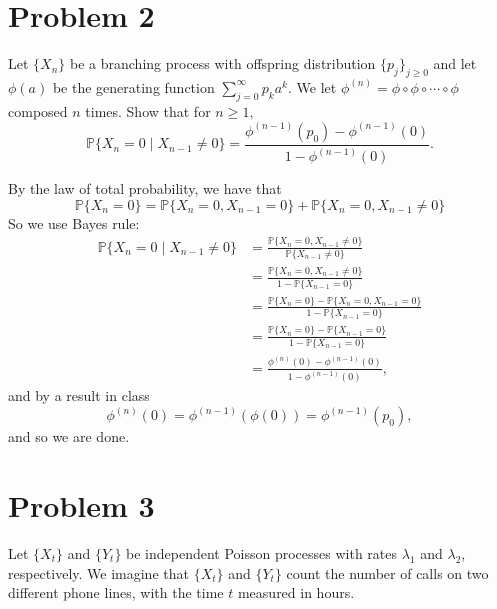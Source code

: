 \documentclass[11pt]{article}
\newcommand{\bbP}{\mathbb{P}}
\begin{document}
\newpage
\section*{Problem 2}
\begin{problem}
    Let $\{X_n\}$ be a branching process with offspring distribution $\{p_j\}_{j \geq 0}$ and let $\phi(a)$ be the generating function $\sum_{j=0}^\infty p_ka^k.$ We let $\phi^{(n)} = \phi \circ \phi \circ \cdots \circ \phi$ composed $n$ times. Show that for $n\geq 1,$ 
    \[\bbP\{X_n = 0 \mid X_{n-1} \neq 0\} = \frac{\phi^{(n-1)}(p_0) - \phi^{(n-1)}(0)}{1 - \phi^{(n-1)}(0)}.\]
\end{problem}
\begin{solution}
By the law of total probability, we have that 
\[\bbP\{X_n = 0\} = \bbP\{X_n = 0, X_{n-1} = 0\} + \bbP\{X_{n} = 0, X_{n-1} \neq 0\}\]
    So we use Bayes rule:
    \begin{align*}
        \bbP\{X_n = 0 \mid X_{n-1} \neq 0\} &= \frac{\bbP\{X_n = 0, X_{n-1} \neq 0\}}{\bbP\{X_{n-1} \neq 0\}}\\
        &= \frac{\bbP\{X_n = 0, X_{n-1} \neq 0\}}{1 - \bbP\{X_{n-1} = 0\}}\\
        &= \frac{\bbP\{X_n = 0\} - \bbP\{X_n = 0, X_{n-1} = 0\}}{1 - \bbP\{X_{n-1} = 0\}}\\
        &=\frac{\bbP\{X_n = 0\} - \bbP\{ X_{n-1} = 0\}}{1 - \bbP\{X_{n-1} = 0\}}\\
        &= \frac{\phi^{(n)}(0) - \phi^{(n-1)}(0)}{1 - \phi^{(n-1)}(0)},
    \end{align*}
    and by a result in class
    \[\phi^{(n)}(0) = \phi^{(n-1)}(\phi(0)) = \phi^{(n-1)}(p_0),\] and so we are done.
    
\end{solution}


\newpage
\section*{Problem 3}
Let \(\{X_t\}\) and \(\{Y_t\}\) be independent Poisson processes with rates \(\lambda_1\) and \(\lambda_2\), respectively. We imagine that \(\{X_t\}\) and \(\{Y_t\}\) count the number of calls on two different phone lines, with the time \(t\) measured in hours.
\end{document}
